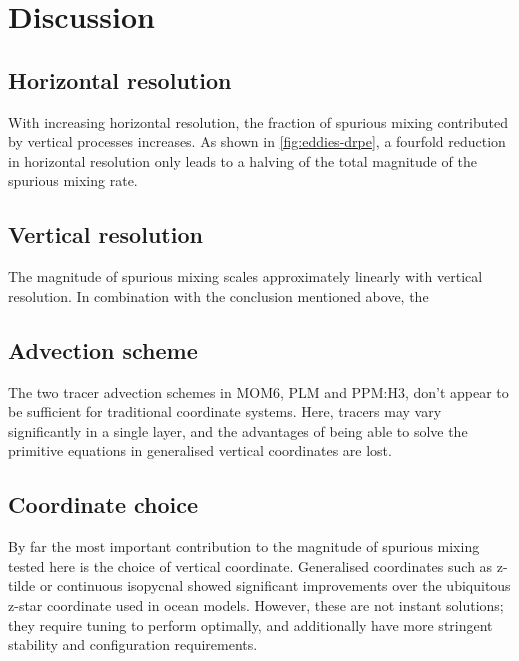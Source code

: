 \section{Discussion}

\subsection{Horizontal resolution}
With increasing horizontal resolution, the fraction of spurious mixing contributed by vertical processes increases. As shown in \cref{fig:eddies-drpe}, a fourfold reduction in horizontal resolution only leads to a halving of the total magnitude of the spurious mixing rate.

\subsection{Vertical resolution}
The magnitude of spurious mixing scales approximately linearly with vertical resolution. In combination with the conclusion mentioned above, the 

\subsection{Advection scheme}
The two tracer advection schemes in MOM6, PLM and PPM:H3, don't appear to be sufficient for traditional coordinate systems. Here, tracers may vary significantly in a single layer, and the advantages of being able to solve the primitive equations in generalised vertical coordinates are lost.

\subsection{Coordinate choice}
By far the most important contribution to the magnitude of spurious mixing tested here is the choice of vertical coordinate. Generalised coordinates such as z-tilde or continuous isopycnal showed significant improvements over the ubiquitous z-star coordinate used in ocean models. However, these are not instant solutions; they require tuning to perform optimally, and additionally have more stringent stability and configuration requirements.
